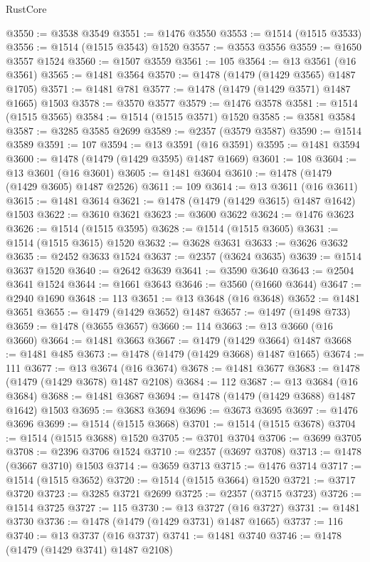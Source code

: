 \begin{lexlean}{RustCore}
\begin{coremodule}
@3550 := @3538 @3549
@3551 := @1476 @3550
@3553 := @1514 (@1515 @3533)
@3556 := @1514 (@1515 @3543) @1520
@3557 := @3553 @3556
@3559 := @1650 @3557 @1524
@3560 := @1507 @3559
@3561 := 105
@3564 := @13 @3561 (@16 @3561)
@3565 := @1481 @3564
@3570 := @1478 (@1479 (@1429 @3565) @1487 @1705)
@3571 := @1481 @781
@3577 := @1478 (@1479 (@1429 @3571) @1487 @1665) @1503
@3578 := @3570 @3577
@3579 := @1476 @3578
@3581 := @1514 (@1515 @3565)
@3584 := @1514 (@1515 @3571) @1520
@3585 := @3581 @3584
@3587 := @3285 @3585 @2699
@3589 := @2357 (@3579 @3587)
@3590 := @1514 @3589
@3591 := 107
@3594 := @13 @3591 (@16 @3591)
@3595 := @1481 @3594
@3600 := @1478 (@1479 (@1429 @3595) @1487 @1669)
@3601 := 108
@3604 := @13 @3601 (@16 @3601)
@3605 := @1481 @3604
@3610 := @1478 (@1479 (@1429 @3605) @1487 @2526)
@3611 := 109
@3614 := @13 @3611 (@16 @3611)
@3615 := @1481 @3614
@3621 := @1478 (@1479 (@1429 @3615) @1487 @1642) @1503
@3622 := @3610 @3621
@3623 := @3600 @3622
@3624 := @1476 @3623
@3626 := @1514 (@1515 @3595)
@3628 := @1514 (@1515 @3605)
@3631 := @1514 (@1515 @3615) @1520
@3632 := @3628 @3631
@3633 := @3626 @3632
@3635 := @2452 @3633 @1524
@3637 := @2357 (@3624 @3635)
@3639 := @1514 @3637 @1520
@3640 := @2642 @3639
@3641 := @3590 @3640
@3643 := @2504 @3641 @1524
@3644 := @1661 @3643
@3646 := @3560 (@1660 @3644)
@3647 := @2940 @1690
@3648 := 113
@3651 := @13 @3648 (@16 @3648)
@3652 := @1481 @3651
@3655 := @1479 (@1429 @3652) @1487
@3657 := @1497 (@1498 @733)
@3659 := @1478 (@3655 @3657)
@3660 := 114
@3663 := @13 @3660 (@16 @3660)
@3664 := @1481 @3663
@3667 := @1479 (@1429 @3664) @1487
@3668 := @1481 @485
@3673 := @1478 (@1479 (@1429 @3668) @1487 @1665)
@3674 := 111
@3677 := @13 @3674 (@16 @3674)
@3678 := @1481 @3677
@3683 := @1478 (@1479 (@1429 @3678) @1487 @2108)
@3684 := 112
@3687 := @13 @3684 (@16 @3684)
@3688 := @1481 @3687
@3694 := @1478 (@1479 (@1429 @3688) @1487 @1642) @1503
@3695 := @3683 @3694
@3696 := @3673 @3695
@3697 := @1476 @3696
@3699 := @1514 (@1515 @3668)
@3701 := @1514 (@1515 @3678)
@3704 := @1514 (@1515 @3688) @1520
@3705 := @3701 @3704
@3706 := @3699 @3705
@3708 := @2396 @3706 @1524
@3710 := @2357 (@3697 @3708)
@3713 := @1478 (@3667 @3710) @1503
@3714 := @3659 @3713
@3715 := @1476 @3714
@3717 := @1514 (@1515 @3652)
@3720 := @1514 (@1515 @3664) @1520
@3721 := @3717 @3720
@3723 := @3285 @3721 @2699
@3725 := @2357 (@3715 @3723)
@3726 := @1514 @3725
@3727 := 115
@3730 := @13 @3727 (@16 @3727)
@3731 := @1481 @3730
@3736 := @1478 (@1479 (@1429 @3731) @1487 @1665)
@3737 := 116
@3740 := @13 @3737 (@16 @3737)
@3741 := @1481 @3740
@3746 := @1478 (@1479 (@1429 @3741) @1487 @2108)

\end{coremodule}
\end{lexlean}
